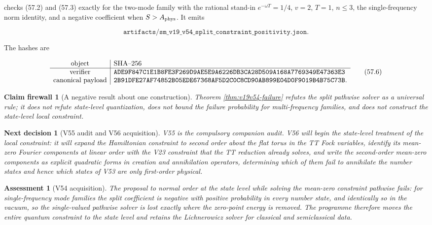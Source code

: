 \documentclass[11pt]{article}
\newtheorem{firewall}[theorem]{Claim firewall}
\newtheorem{decision}[theorem]{Next decision}
\newtheorem{assessment}[theorem]{Assessment}
\theoremstyle{remark}
\begin{document}
checks (57.2) and (57.3) exactly for the two-mode family with the
rational stand-in \(e^{-\omega T}=1/4\), \(v=2\), \(T=1\), \(n\leq3\),
the single-frequency norm identity, and a negative coefficient when
\(S>A_{\rm phys}\).  It emits

\[
 \texttt{artifacts/sm\_v19\_v54\_split\_constraint\_positivity.json}.
                                                                    \tag{57.5}
\]

The hashes are

\[
\begin{array}{c|l}
\hbox{object}&\hbox{SHA--256}\\ \hline
\hbox{verifier}&
\texttt{ADE9F847C1E1B8FE3F269D9AE5E9A6226DB3CA28D509A168A7769349E47363E3}\\
\hbox{canonical payload}&
\texttt{2B91DFE27AF74852B05EDE67368AF5D2C0C8CD90AB899E04D0F9019B4B75C73B}.
\end{array}                                                     \tag{57.6}
\]

\begin{firewall}[A negative result about one construction]
\label{fire:v19v54}
Theorem \ref{thm:v19v54-failure} refutes the split pathwise solver as
a universal rule; it does not refute state-level quantization, does
not bound the failure probability for multi-frequency families, and
does not construct the state-level local constraint.
\end{firewall}

\begin{decision}[V55 audit and V56 acquisition]
\label{dec:v19v54-next}
V55 is the compulsory companion audit.  V56 will begin the
state-level treatment of the local constraint: it will expand the
Hamiltonian constraint to second order about the flat torus in the TT
Fock variables, identify its mean-zero Fourier components at
linear order with the V23 constraint that the TT reduction already
solves, and write the second-order mean-zero components as explicit
quadratic forms in creation and annihilation operators, determining
which of them fail to annihilate the number states and hence which
states of V53 are only first-order physical.
\end{decision}

\begin{assessment}[V54 acquisition]
\label{ass:v19v54}
The proposal to normal order at the state level while solving the
mean-zero constraint pathwise fails: for single-frequency mode families
the split coefficient is negative with positive probability in every
number state, and identically so in the vacuum, so the single-valued
pathwise solver is lost exactly where the zero-point energy is
removed.  The programme therefore moves the entire quantum constraint
to the state level and retains the Lichnerowicz solver for classical
and semiclassical data.
\end{assessment}
\end{document}
